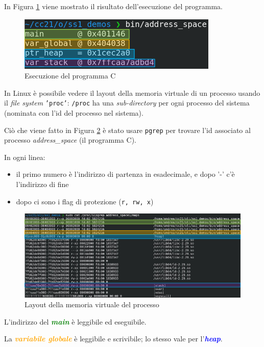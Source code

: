 In Figura \ref{fig:ex-c2} viene mostrato il risultato dell'esecuzione del programma.

\begin{figure}[ht]
    \centering
    \includegraphics[width=0.75\linewidth]{images/example-2.png}
    \caption{Esecuzione del programma C}
    \label{fig:ex-c2}
\end{figure}

In Linux è possibile vedere il layout della memoria virtuale di un processo usando
il \textit{file system} \texttt{'proc'}: \texttt{/proc} ha una \textit{sub-directory} per
ogni processo del sistema (nominata con l'id del processo nel sistema).

Ciò che viene fatto in Figura \ref{fig:ex-c3} è stato usare \texttt{pgrep} per trovare l'id associato al processo \textit{address\_space} (il
programma C).

\newpage
In ogni linea:
\begin{itemize}
    \item il primo numero è l'indirizzo di partenza in esadecimale, e dopo '-' c'è l'indirizzo di fine
    \item dopo ci sono i flag di protezione (\texttt{r, rw, x})
\end{itemize}

\begin{figure}[ht]
    \centering
    \includegraphics[width=1\linewidth]{images/example-3.png}
    \caption{Layout della memoria virtuale del processo}
    \label{fig:ex-c3}
\end{figure}

L'indirizzo del  \textcolor{green}{\textbf{\textit{main}}} è leggibile ed eseguibile.

La \textcolor{orange}{\textbf{\textit{variabile globale}}} è leggibile e scrivibile; 
lo stesso vale per l'\textcolor{blue}{\textbf{\textit{heap}}}.

